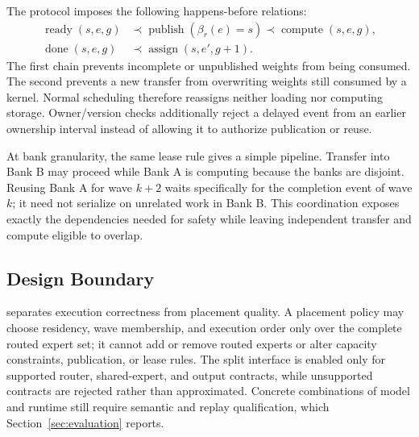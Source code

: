 The protocol imposes the following happens-before relations:
\begin{equation}
\begin{aligned}
  \operatorname{ready}(s,e,g) &\prec
  \operatorname{publish}(\beta_r(e)=s)
  \prec \operatorname{compute}(s,e,g), \\
  \operatorname{done}(s,e,g) &\prec
  \operatorname{assign}(s,e',g+1).
\end{aligned}
\end{equation}
The first chain prevents incomplete or unpublished weights from being
consumed. The second prevents a new transfer from overwriting weights still
consumed by a kernel.
Normal scheduling therefore reassigns neither loading nor computing storage.
Owner/version checks additionally reject a delayed event from an earlier
ownership interval instead of allowing it to authorize publication or reuse.

At bank granularity, the same lease rule gives a simple pipeline. Transfer
into Bank B may proceed while Bank A is computing because the banks are
disjoint. Reusing Bank A for wave $k+2$ waits specifically for the completion
event of wave $k$; it need not serialize on unrelated work in Bank B. This
coordination exposes exactly the dependencies needed for safety while leaving
independent transfer and compute eligible to overlap.

\subsection{Design Boundary}
\label{sec:design-boundary}

\system separates execution correctness from placement quality. A placement
policy may choose residency, wave membership, and execution order only over the
complete routed expert set; it cannot add or remove routed experts or alter
capacity constraints, publication, or lease rules. The split interface is
enabled only for supported router, shared-expert, and output contracts, while
unsupported contracts are rejected rather than approximated. Concrete
combinations of model and runtime still require semantic and replay
qualification, which Section~\ref{sec:evaluation} reports.
